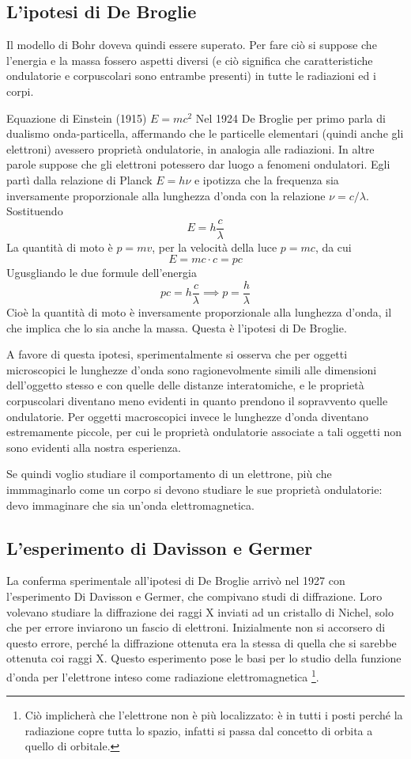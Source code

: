 \subsection{L'ipotesi di De Broglie}
Il modello di Bohr doveva quindi essere superato. Per fare ciò si suppose che l'energia e la massa fossero aspetti diversi (e ciò significa che caratteristiche ondulatorie e corpuscolari sono entrambe presenti) in tutte le radiazioni ed i corpi.

Equazione di Einstein (1915) $E=mc^2$
Nel 1924 De Broglie per primo parla di dualismo onda-particella, affermando che le particelle elementari (quindi anche gli elettroni) avessero proprietà ondulatorie, in analogia alle radiazioni. In altre parole suppose che gli elettroni potessero dar luogo a fenomeni ondulatori. Egli partì dalla relazione di Planck $E=h\nu$ e ipotizza che la frequenza sia inversamente proporzionale alla lunghezza d'onda con la relazione $\nu=c/\lambda$. Sostituendo
$$E=h\frac{c}{\lambda}$$
La quantità di moto è $p=mv$, per la velocità della luce $p=mc$, da cui
$$E=mc \cdot c=pc$$
Ugusgliando le due formule dell'energia
$$pc=h\frac{c}{\lambda} \implies p=\frac{h}{\lambda}$$
Cioè la quantità di moto è inversamente proporzionale alla lunghezza d'onda, il che implica che lo sia anche la massa. Questa è l'ipotesi di De Broglie.

A favore di questa ipotesi, sperimentalmente si osserva che per oggetti microscopici le lunghezze d'onda sono ragionevolmente simili alle dimensioni dell'oggetto stesso e con quelle delle distanze interatomiche, e le proprietà corpuscolari diventano meno evidenti in quanto prendono il sopravvento quelle ondulatorie. Per oggetti macroscopici invece le lunghezze d'onda diventano estremamente piccole, per cui le proprietà ondulatorie associate a tali oggetti non sono evidenti alla nostra esperienza.

Se quindi voglio studiare il comportamento di un elettrone, più che immmaginarlo come un corpo si devono studiare le sue proprietà ondulatorie: devo immaginare che sia un'onda elettromagnetica.
\subsection{L'esperimento di Davisson e Germer}
La conferma sperimentale all'ipotesi di De Broglie arrivò nel 1927 con l'esperimento Di Davisson e Germer, che compivano studi di diffrazione. Loro volevano studiare la diffrazione dei raggi X inviati ad un cristallo di Nichel, solo che per errore inviarono un fascio di elettroni. Inizialmente non si accorsero di questo errore, perché la diffrazione ottenuta era la stessa di quella che si sarebbe ottenuta coi raggi X.
Questo esperimento pose le basi per lo studio della funzione d'onda per l'elettrone inteso come radiazione elettromagnetica \footnote{Ciò implicherà che l'elettrone non è più localizzato: è in tutti i posti perché la radiazione copre tutta lo spazio, infatti si passa dal concetto di orbita a quello di orbitale.}.

